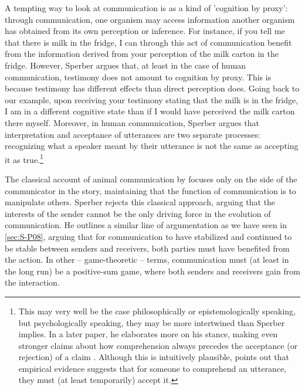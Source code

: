 A tempting way to look at communication is as a kind of 'cognition by proxy': through communication, one organism may access information another organism has obtained from its own perception or inference. For instance, if you tell me that there is milk in the fridge, I can through this act of communication benefit from the information derived from your perception of the milk carton in the fridge.
However, Sperber argues that, at least in the case of human communication, testimony does not amount to cognition by proxy. This is because testimony has different effects than direct perception does. Going back to our example, upon receiving your testimony stating that the milk is in the fridge, I am in a different cognitive state than if I would have perceived the milk carton there myself. Moreover, in human communication, Sperber argues that interpretation and acceptance of utterances are two separate processes: recognizing what a speaker meant by their utterance is not the same as accepting it as true.\footnote{This may very well be the case philosophically or epistemologically speaking, but psychologically speaking, they may be more intertwined than Sperber implies. In a later paper, he elaborates more on his stance, making even stronger claims about how comprehension always precedes the acceptance (or rejection) of a claim \citep[\S 3]{Sperber10}. Although this is intuitively plausible, \citet{Lewandowsky12} points out that empirical evidence suggests that for someone to comprehend an utterance, they must (at least temporarily) accept it.}

The classical account of animal communication by \citet{DawkinsKrebs78} focuses only on the side of the communicator in the story, maintaining that the function of communication is to manipulate others. Sperber rejects this classical approach, arguing that the interests of the sender cannot be the only driving force in the evolution of communication.
He outlines a similar line of argumentation as we have seen in \cref{sec:S-P08},
arguing that for communication to have stabilized and continued to be stable between senders and receivers, both parties must have benefited from the action. In other -- game-theoretic -- terms, communication must (at least in the long run) be a positive-sum game, where both senders and receivers gain from the interaction.

